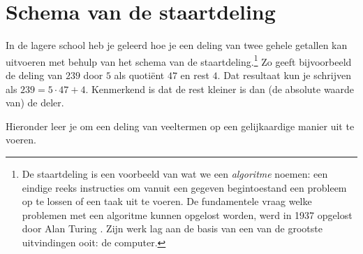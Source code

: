 \documentclass{ximera}
\begin{document}
	\author{Koen de Naeghel - Wiskunde Op Maat}



	\section{Schema van de staartdeling}

	In de lagere school heb je geleerd hoe je een deling van twee gehele getallen kan uitvoeren met behulp van het schema van de staartdeling.\footnote{De staartdeling is een voorbeeld van wat we een {\em algoritme} noemen: een eindige reeks instructies om vanuit een gegeven begintoestand een probleem op te lossen of een taak uit te voeren. De fundamentele vraag welke problemen met een algoritme kunnen opgelost worden, werd in 1937 opgelost door Alan Turing \cite{Turing}. Zijn werk lag aan de basis van een van de grootste uitvindingen ooit: de computer.} Zo geeft bijvoorbeeld de deling van $239$ door $5$ als quoti\"ent $47$ en rest $4$. Dat resultaat kun je schrijven als $239 = 5 \cdot 47 + 4$. Kenmerkend is dat de rest kleiner is dan (de absolute waarde van) de deler. 
	
	Hieronder leer je om een deling van veeltermen op een gelijkaardige manier uit te voeren.
	
\end{document}
